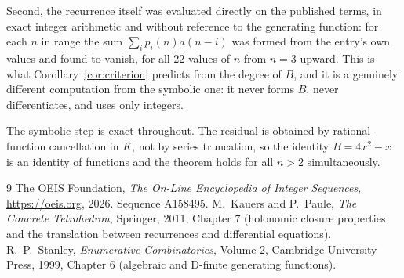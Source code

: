 \documentclass[11pt,a4paper]{article}
\theoremstyle{plain}
\theoremstyle{definition}
\begin{document}
Second, the recurrence itself was evaluated directly on the published terms, in exact
integer arithmetic and without reference to the generating function: for each $n$ in range
the sum $\sum_{i}p_{i}(n)a(n-i)$ was formed from the entry's own values and found to
vanish, for all 22 values of $n$ from $n=3$ upward. This is what
Corollary~\ref{cor:criterion} predicts from the degree of $B$, and it is a genuinely
different computation from the symbolic one: it never forms $B$, never differentiates, and
uses only integers.

The symbolic step is exact throughout. The residual is obtained by rational-function
cancellation in $K$, not by series truncation, so the identity $B=4 x^{2} - x$ is an
identity of functions and the theorem holds for all $n>2$ simultaneously.

\begin{thebibliography}{9}
 The OEIS Foundation, \emph{The On-Line Encyclopedia of Integer Sequences},
\url{https://oeis.org}, 2026. Sequence A158495.
 M.~Kauers and P.~Paule, \emph{The Concrete Tetrahedron}, Springer, 2011,
Chapter 7 (holonomic closure properties and the translation between recurrences and
differential equations).
 R.~P.~Stanley, \emph{Enumerative Combinatorics}, Volume 2, Cambridge
University Press, 1999, Chapter 6 (algebraic and D-finite generating functions).
\end{thebibliography}
\end{document}

